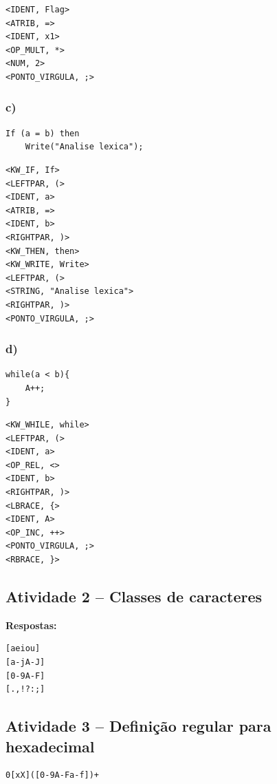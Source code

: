 \documentclass[12pt,a4paper]{article}
\begin{document}
\begin{lstlisting}[style=codeblock]
<IDENT, Flag>
<ATRIB, =>
<IDENT, x1>
<OP_MULT, *>
<NUM, 2>
<PONTO_VIRGULA, ;>
\end{lstlisting}

\subsubsection*{c)}
\begin{lstlisting}[style=codeblock]
If (a = b) then
    Write("Analise lexica");
\end{lstlisting}

\begin{lstlisting}[style=codeblock]
<KW_IF, If>
<LEFTPAR, (>
<IDENT, a>
<ATRIB, =>
<IDENT, b>
<RIGHTPAR, )>
<KW_THEN, then>
<KW_WRITE, Write>
<LEFTPAR, (>
<STRING, "Analise lexica">
<RIGHTPAR, )>
<PONTO_VIRGULA, ;>
\end{lstlisting}

\subsubsection*{d)}
\begin{lstlisting}[style=codeblock]
while(a < b){
    A++;
}
\end{lstlisting}

\begin{lstlisting}[style=codeblock]
<KW_WHILE, while>
<LEFTPAR, (>
<IDENT, a>
<OP_REL, <>
<IDENT, b>
<RIGHTPAR, )>
<LBRACE, {>
<IDENT, A>
<OP_INC, ++>
<PONTO_VIRGULA, ;>
<RBRACE, }>
\end{lstlisting}

\subsection*{Atividade 2 -- Classes de caracteres}

\textbf{Respostas:}
\begin{lstlisting}[style=codeblock]
[aeiou]
[a-jA-J]
[0-9A-F]
[.,!?:;]
\end{lstlisting}

\subsection*{Atividade 3 -- Definição regular para hexadecimal}
\begin{lstlisting}[style=codeblock]
0[xX]([0-9A-Fa-f])+
\end{lstlisting}
\end{document}

